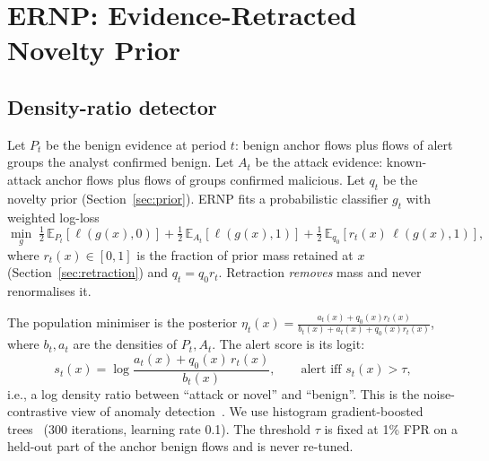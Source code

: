 \documentclass[preprint,12pt]{elsarticle}
\begin{document}
\section{ERNP: Evidence-Retracted Novelty Prior}\label{sec:method}
\subsection{Density-ratio detector}
Let $P_t$ be the benign evidence at period $t$: benign anchor flows plus flows of alert groups the analyst confirmed benign. Let $A_t$ be the attack evidence: known-attack anchor flows plus flows of groups confirmed malicious. Let $q_t$ be the novelty prior (Section~\ref{sec:prior}). ERNP fits a probabilistic classifier $g_t$ with weighted log-loss
\begin{equation}
\min_g\; \tfrac12\,\mathbb{E}_{P_t}[\ell(g(x),0)] + \tfrac12\,\mathbb{E}_{A_t}[\ell(g(x),1)] + \tfrac12\,\mathbb{E}_{q_0}\!\left[r_t(x)\,\ell(g(x),1)\right],\label{eq:loss}
\end{equation}
where $r_t(x)\in[0,1]$ is the fraction of prior mass retained at $x$ (Section~\ref{sec:retraction}) and $q_t=q_0 r_t$. Retraction \emph{removes} mass and never renormalises it.

The population minimiser is the posterior $\eta_t(x)=\frac{a_t(x)+q_0(x)r_t(x)}{b_t(x)+a_t(x)+q_0(x)r_t(x)}$, where $b_t,a_t$ are the densities of $P_t,A_t$. The alert score is its logit:
\begin{equation}
s_t(x)=\log\frac{a_t(x)+q_0(x)\,r_t(x)}{b_t(x)},\qquad \text{alert iff } s_t(x)>\tau,\label{eq:score}
\end{equation}
i.e., a log density ratio between ``attack or novel'' and ``benign''. This is the noise-contrastive view of anomaly detection~\cite{steinwart2005classification,gutmann2010nce}. We use histogram gradient-boosted trees~\cite{friedman2001gbm,pedregosa2011sklearn} (300 iterations, learning rate 0.1). The threshold $\tau$ is fixed at 1\% FPR on a held-out part of the anchor benign flows and is never re-tuned.
\end{document}
